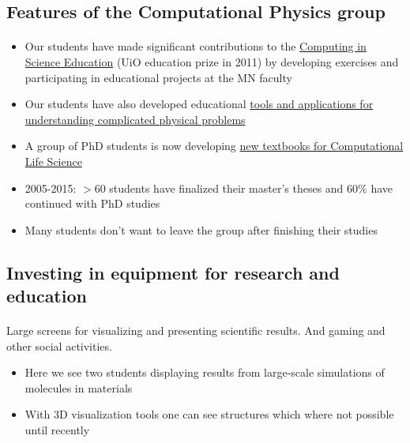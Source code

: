 \documentclass[%
twoside,                 %
final,                   %
10pt]{article}
\begin{document}
\noindent





\subsection{Features of the Computational Physics group}

\paragraph{}
\begin{itemize}
\item Our students have made significant contributions to  the \href{{http://www.mn.uio.no/english/about/collaboration/cse/}}{Computing in Science Education}  (UiO education prize in 2011) by developing exercises and participating in educational projects at the MN faculty

\item Our students have also developed educational \href{{http://www.mn.uio.no/fysikk/om/aktuelt/aktuelle-saker/2015/realfagsapper.html}}{tools and applications for understanding complicated physical problems}

\item A group of PhD students is now developing \href{{https://github.com/CINPLA/ibvcse}}{new textbooks for Computational Life Science}

\item 2005-2015: $> 60$ students have finalized their master's theses and 60\% have continued with PhD studies

\item Many students don't want to leave the group after finishing their studies
\end{itemize}

\noindent






\subsection{Investing in equipment for research and education}

\paragraph{}
Large screens for visualizing and presenting scientific results. And gaming and other social activities. 
\begin{itemize}
\item Here we see two students displaying results from large-scale simulations of molecules in materials

\item With 3D visualization tools one can see structures which where not possible until recently
\end{itemize}
\end{document}
